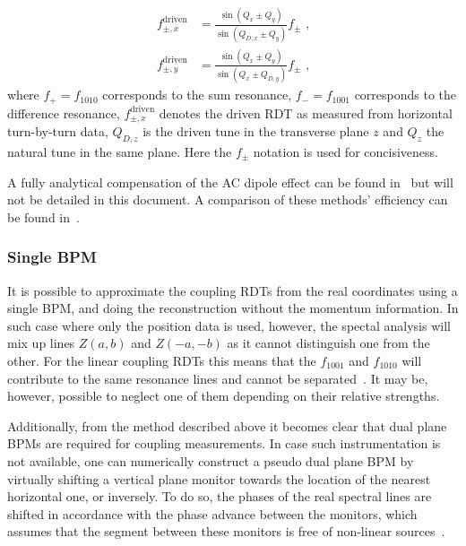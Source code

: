 \begin{equation}
  \begin{aligned}
    f_{\pm, x}^{\mathrm{driven}} &= \frac{\sin \left( Q_x \pm Q_y \right)}{\sin \left( Q_{D,x} \pm Q_y \right)} f_{\pm} \text{ ,} \\
    f_{\pm, y}^{\mathrm{driven}} &= \frac{\sin \left( Q_x \pm Q_y \right)}{\sin \left( Q_x \pm Q_{D,y} \right)} f_{\pm} \text{ ,}
  \end{aligned}
  \label{equation:rescaling_coupling_rdts}
\end{equation}
where \(f_{+} = f_{1010}\) corresponds to the sum resonance, \(f_{-} = f_{1001}\) corresponds to the difference resonance, \(f_{\pm, x}^{\mathrm{driven}}\) denotes the driven \gls{RDT} as measured from horizontal turn-by-turn data, \(Q_{D, z}\) is the driven tune in the transverse plane \(z\) and \(Q_z\) the natural tune in the same plane.
Here the \(f_{\pm}\) notation is used for concisiveness.

A fully analytical compensation of the AC dipole effect can be found in~\cite{REPORT:Miyamoto:Measurement_Coupling_Resonance_Driving_Terms,IPAC:Miyamoto:Measurement_Coupling_RDTs_LHC_AC_Dipole} but will not be detailed in this document.
A comparison of these methods' efficiency can be found in~\cite{IPAC:Wegscheider:NBPM_Momentum_Reconstruction_for_Linear_Coupling_RDTs}.

\subsubsection*{Single BPM}

It is possible to approximate the coupling \glspl{RDT} from the real coordinates using a single \gls{BPM}, and doing the reconstruction without the momentum information.
In such case where only the position data is used, however, the spectal analysis will mix up lines \(Z(a,b)\) and \(Z(-a, -b)\) as it cannot distinguish one from the other.
For the linear coupling RDTs this means that the \(f_{1001}\) and \(f_{1010}\) will contribute to the same resonance lines and cannot be separated~\cite{PHD:Persson}.
It may be, however, possible to neglect one of them depending on their relative strengths.

Additionally, from the method described above it becomes clear that dual plane BPMs are required for coupling measurements.
In case such instrumentation is not available, one can numerically construct a pseudo dual plane BPM by virtually shifting a vertical plane monitor towards the location of the nearest horizontal one, or inversely.
To do so, the phases of the real spectral lines are shifted in accordance with the phase advance between the monitors, which assumes that the segment between these monitors is free of non-linear sources~\cite{PHD:Vanbavinckhove}.


